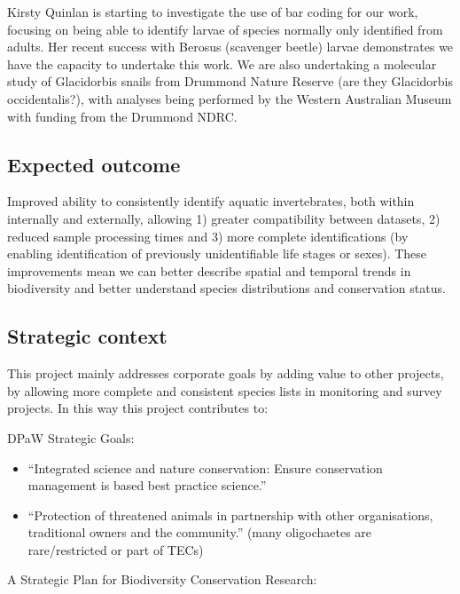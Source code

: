 \documentclass[version=last,
    paper=a4, %
    10pt, %
    usenames,
    dvipsnames,
    oneside, %
    headings=openany, %
    DIV=15 %
]{scrbook}
\begin{document}
Kirsty Quinlan is starting to investigate the use of bar coding for our
work, focusing on being able to identify larvae of species normally only
identified from adults. Her recent success with Berosus (scavenger
beetle) larvae demonstrates we have the capacity to undertake this work.
We are also undertaking a molecular study of Glacidorbis snails from
Drummond Nature Reserve (are they Glacidorbis occidentalis?), with
analyses being performed by the Western Australian Museum with funding
from the Drummond NDRC.




\subsection*{Expected outcome}

Improved ability to consistently identify aquatic invertebrates, both
within internally and externally, allowing 1) greater compatibility
between datasets, 2) reduced sample processing times and 3) more
complete identifications (by enabling identification of previously
unidentifiable life stages or sexes). These improvements mean we can
better describe spatial and temporal trends in biodiversity and better
understand species distributions and conservation status.




\subsection*{Strategic context}

This project mainly addresses corporate goals by adding value to other
projects, by allowing more complete and consistent species lists in
monitoring and survey projects. In this way this project contributes to:

DPaW Strategic Goals:

\begin{itemize}
\itemsep1pt\parskip0pt
\item
  ``Integrated science and nature conservation: Ensure conservation
  management is based best practice science.''
\item
  ``Protection of threatened animals in partnership with other
  organisations, traditional owners and the community.'' (many
  oligochaetes are rare/restricted or part of TECs)
\end{itemize}

A Strategic Plan for Biodiversity Conservation Research:
\end{document}
